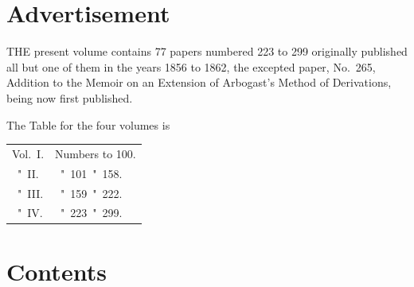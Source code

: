 \documentclass[11pt,a4paper]{book}
\theoremstyle{plain}
\begin{document}
\chapter*{Advertisement}
\thispagestyle{empty}

THE present volume contains 77 papers numbered 223 to 299 originally published all but one of them in the years 1856 to 1862, the excepted paper, No.~265, Addition to the Memoir on an Extension of Arbogast's Method of Derivations, being now first published.

The Table for the four volumes is

\begin{center}
\begin{tabular}{ll}
Vol.\ I. & Numbers \quad 1 to 100. \\
\phantom{Vol.}\ "\ II. & \phantom{Numbers}\ "\ 101\ "\ 158. \\
\phantom{Vol.}\ "\ III. & \phantom{Numbers}\ "\ 159\ "\ 222. \\
\phantom{Vol.}\ "\ IV. & \phantom{Numbers}\ "\ 223\ "\ 299. \\
\end{tabular}
\end{center}
\newpage

\thispagestyle{empty}
\mbox{}
\newpage

\chapter*{Contents}
\thispagestyle{empty}
\end{document}
